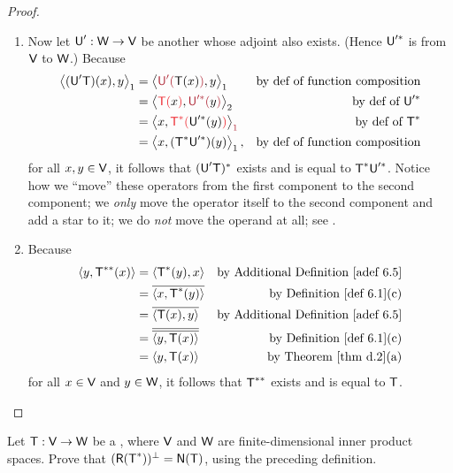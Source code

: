 \begin{proof}
\begin{enumerate}
\item 
Now let \(\textsf{U}' : \textsf{W} \to \textsf{V}\) be another \LTRAN{} whose adjoint also exists.
(Hence \(\textsf{U}'^*\) is from \(\textsf{V}\) to \(\textsf{W}\).)
Because
\begin{align*}
    \LG (\U'\T)(x), y \RG_1
        & = \LG \MAROON{\U'(}\T(x)\MAROON{)}, y \RG_1 & \text{by def of function composition} \\
        & = \LG \RED{\T(}x\RED{)}, \MAROON{\U'^*(}y\MAROON{)} \RG_2 & \text{by def of \(\U'^*\)} \\
        & = \LG x, \RED{\T^*(}\U'^*(y)\RED{)} \RG_{\MAROON{1}} & \text{by def of \(\T^*\)} \\
        & = \LG x, (\T^*\U'^*)(y) \RG_1, & \text{by def of function composition}
\end{align*}
for all \(x, y \in \textsf{V}\), it follows that \((\textsf{U}'\textsf{T})^*\) exists and is equal to \(\textsf{T}^*\textsf{U}'^*\).
Notice how we ``move'' these operators from the first component to the second component;
we \emph{only} move the operator itself to the second component and add a star to it;
we do \emph{not} move the operand at all;
see .

\item Because
\begin{align*}
    \LG y, \T^{**}(x) \RG & = \LG \T^*(y), x \RG & \text{by \ADEF{6.5}} \\
        & = \conjugatet{\LG x, \T^*(y) \RG} & \text{by \DEF{6.1}(c)} \\
        & = \conjugatet{\LG \T(x), y \RG} & \text{by \ADEF{6.5}} \\
        & = \conjugatet{\conjugatet{\LG y, \T(x) \RG}} & \text{by \DEF{6.1}(c)} \\
        & = \LG y, \T(x) \RG & \text{by \THM{d.2}(a)}
\end{align*}
for all \(x \in \textsf{V}\) and \(y \in \textsf{W}\), it follows that \(\textsf{T}^{**}\) exists and is equal to \(\textsf{T}\).
\end{enumerate}
\end{proof}

\begin{exercise} \label{exercise 6.3.17}
Let \(\textsf{T} : \textsf{V} \to \textsf{W}\) be a \LTRAN{}, where \(\textsf{V}\) and \(\textsf{W}\) are finite-dimensional inner product spaces.
Prove that \((\textsf{R}(\textsf{T}^*))^{\perp} = \textsf{N}(\textsf{T})\), using
the preceding definition.
\end{exercise}

